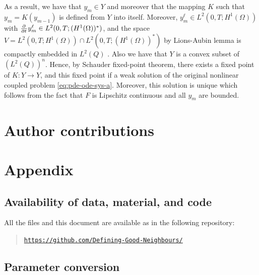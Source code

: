 \documentclass[11pt]{article}
\begin{document}
As a result, we have that \(y_m \in Y\) and moreover that the mapping \(K\) such that \( y_m = K(y_{m-1})\) is defined from \(Y \) into itself. Moreover, 
\(y_m^\ell \in L^2(0,T; H^1(\Omega))\) with \(\pd{ }{t} y_m^\ell \in L^2(0,T; (H^1(\Omega))^*)\), and the space 
\(V= L^2(0,T; H^1(\Omega)) \cap L^2(0,T; (H^1(\Omega))^*)\)  by Lions-Aubin lemma is compactly embedded in \(L^2(Q)\) \cite{Aubin-1963}. Also we have that \(Y\) is a convex subset of \((L^2(Q))^n\). 
Hence, by Schauder fixed-point theorem, there exists a fixed point of \(K:Y\to Y\), and this fixed point if a weak solution of the original nonlinear coupled problem \eqref{eq:pde-ode-sys-a}. Moreover, this  solution is unique which follows from the fact that \(F\) is Lipschitz continuous and all \(y_m\) are bounded.































\newpage
\section{Author contributions}

\clearpage
\newpage




% 
\newpage
\nocite{*} 
\printbibliography

\newpage
\appendix
\section*{Appendix}
\renewcommand{\thesubsection}{\Alph{subsection}}

\subsection{Availability of data, material, and code}
\label{app:one}
All the files and this document are available as in the following repository:
\begin{quote}
    \noindent \href{https://github.com/Defining-Good-Neighbours/}{\texttt{https://github.com/Defining-Good-Neighbours/}}
\end{quote}


\subsection{Parameter conversion}
\label{app:two}
\end{document}
